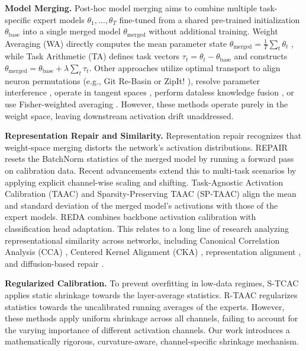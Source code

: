 \documentclass{article}
\theoremstyle{plain}
\theoremstyle{definition}
\theoremstyle{remark}
\begin{document}
\textbf{Model Merging.} Post-hoc model merging aims to combine multiple task-specific expert models $\theta_1, \dots, \theta_T$ fine-tuned from a shared pre-trained initialization $\theta_{\text{base}}$ into a single merged model $\theta_{\text{merged}}$ without additional training. Weight Averaging (WA) directly computes the mean parameter state $\theta_{\text{merged}} = \frac{1}{T}\sum_t \theta_t$ \cite{wortsman22soups, choshen2022fusing}, while Task Arithmetic (TA) \cite{ilharco2022editing, ilharco2022patching} defines task vectors $\tau_t = \theta_t - \theta_{\text{base}}$ and constructs $\theta_{\text{merged}} = \theta_{\text{base}} + \lambda \sum_t \tau_t$. Other approaches utilize optimal transport to align neuron permutations (e.g., Git Re-Basin \cite{ainsworth2022git, pena2023rebasin} or ZipIt! \cite{stoica2023zipit, zhang2023zipitbased}), resolve parameter interference \cite{yadav2023resolving, daheim2023elastic}, operate in tangent spaces \cite{ortiz2023tangent, yu2023merge}, perform dataless knowledge fusion \cite{jin2022dataless}, or use Fisher-weighted averaging \cite{matena2022merging}. However, these methods operate purely in the weight space, leaving downstream activation drift unaddressed.

\textbf{Representation Repair and Similarity.} Representation repair recognizes that weight-space merging distorts the network's activation distributions. REPAIR \cite{jordan2022repair} resets the BatchNorm statistics of the merged model by running a forward pass on calibration data. Recent advancements extend this to multi-task scenarios by applying explicit channel-wise scaling and shifting. Task-Agnostic Activation Calibration (TAAC) and Sparsity-Preserving TAAC (SP-TAAC) \cite{submission8} align the mean and standard deviation of the merged model's activations with those of the expert models. REDA \cite{submission7} combines backbone activation calibration with classification head adaptation. This relates to a long line of research analyzing representational similarity across networks, including Canonical Correlation Analysis (CCA) \cite{mcneely2021canonical, raghu2017svcca}, Centered Kernel Alignment (CKA) \cite{kornblith2019similarity, morcos2018insights}, representation alignment \cite{lu2023representation}, and diffusion-based repair \cite{donyehiya2023cold}.

\textbf{Regularized Calibration.} To prevent overfitting in low-data regimes, S-TCAC \cite{submission3} applies static shrinkage towards the layer-average statistics. R-TAAC \cite{submission8} regularizes statistics towards the uncalibrated running averages of the experts. However, these methods apply uniform shrinkage across all channels, failing to account for the varying importance of different activation channels. Our work introduces a mathematically rigorous, curvature-aware, channel-specific shrinkage mechanism.
\end{document}
